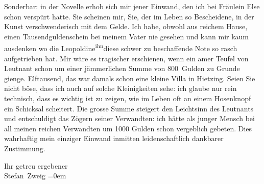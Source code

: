 \pstart
           Sonderbar: in der Novelle
               erhob sich mir jener Einwand, den ich bei Fräulein
                  Else schon verspürt hatte. Sie scheinen mir, Sie, der im Leben so
               Bescheidene, in der Kunst verschwenderisch mit dem Gelde. Ich habe, obwohl aus
               reichem Hause, einen Tausendguldenschein \introOben{}bei meinem Vater\introOben{}
               nie gesehen und kann mir kaum ausdenken wo die Leopoldine\substVorne{}\textsuperscript{ihn}\substDazwischen{}diese schwer zu beschaffende Note so rasch\substHinten{} aufgetrieben hat. Mir wäre es tragischer erschienen, wenn ein amer Teufel
               von Leutnant schon um einer jämmerlichen Summe von 800 Gulden zu Grunde gienge.
               Elftausend, das war damals schon eine \introOben{}kleine\introOben{} Villa in Hietzing. Seien Sie nicht böse, dass ich \introOben{}auch\introOben{} auf solche Kleinigkeiten sehe: ich glaube nur rein
               technisch, dass es wichtig ist zu zeigen, wie im Leben oft an einem Hosenknopf ein
               Schicksal scheitert. Die grosse Summe steigert den Leichtsinn des Leutnants und
               entschuldigt das Zögern seiner Verwandten: ich hätte als junger Mensch bei all meinen
               reichen Verwandten um 1000 Gulden schon vergeblich gebeten. Dies wahrhaftig mein
               einziger Einwand inmitten leidenschaftlich dankbarer Zustimmung.\pend
           
\pstart
           Ihr getreu ergebener{\\[\baselineskip]}\spacefill\mbox{Stefan Zweig}\pend
           \leftskip=0em{}\endnumbering{}
\begin{anhang}
\end{anhang}
      